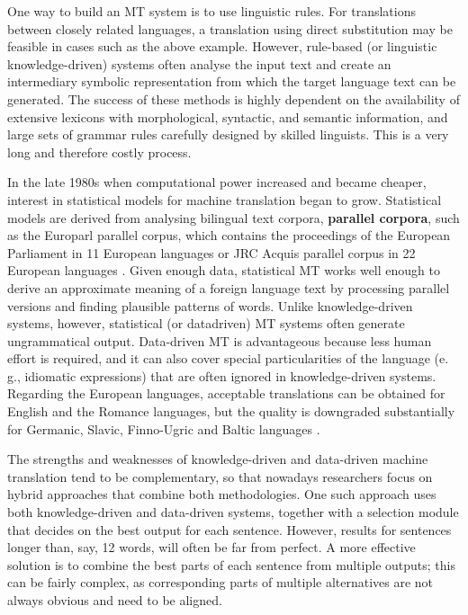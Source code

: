 \begin{multicols}{2}
One way to build an MT system is to use linguistic rules. For translations between closely related languages, a translation using direct substitution may be feasible in cases such as the above example. However, rule-based (or linguistic knowledge-driven) systems often analyse the input text and create an intermediary symbolic representation from which the target language text can be generated. The success of these methods is highly dependent on the availability of extensive lexicons with morphological, syntactic, and semantic information, and large sets of grammar rules carefully designed by skilled linguists. This is a very long and therefore costly process.

In the late 1980s when computational power increased and became cheaper, interest in statistical models for machine translation began to grow. Statistical models are derived from analysing bilingual text corpora, \textbf{parallel corpora}, such as the Europarl parallel corpus, which contains the proceedings of the European Parliament in 11 European languages or JRC Acquis parallel corpus in 22 European languages \cite{pro1}. Given enough data, statistical MT works well enough to derive an approximate meaning of a foreign language text by processing parallel versions and finding plausible patterns of words. Unlike knowledge-driven systems, however, statistical (or datadriven) MT systems often generate ungrammatical output. Data-driven MT is advantageous because less human effort is required, and it can also cover special particularities of the language (e.\,g., idiomatic expressions) that are often ignored in knowledge-driven systems. Regarding the European languages, acceptable translations can be obtained for English and the Romance languages, but the quality is downgraded substantially for Germanic, Slavic, Finno-Ugric and Baltic languages \cite{pro2}.


The strengths and weaknesses of knowledge-driven and data-driven machine translation tend to be complementary, so that nowadays researchers focus on hybrid approaches that combine both methodologies. One such approach uses both knowledge-driven and data-driven systems, together with a selection module that decides on the best output for each sentence. However, results for sentences longer than, say, 12 words, will often be far from perfect. A more effective solution is to combine the best parts of each sentence from multiple outputs; this can be fairly complex, as corresponding parts of multiple alternatives are not always obvious and need to be aligned. 


\end{multicols}
